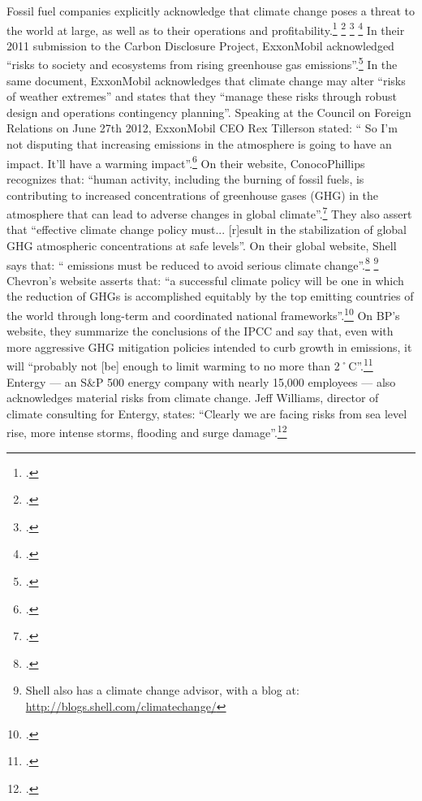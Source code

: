 \documentclass[10pt]{article}
\begin{document}
Fossil fuel companies explicitly acknowledge that climate change poses a threat to the world at large, as well as to their operations and profitability.\footcite[][]{FFcorpsPlanning} \footcite[][]{OilCosFearFI} \footcite[][]{DemiseOfCrudeDenial} \footcite[][]{DoTheOpposite}
In their 2011 submission to the Carbon Disclosure Project, ExxonMobil acknowledged ``risks to society and ecosystems from rising greenhouse gas emissions''.\footcite[][]{ExxonCDP2011}
In the same document, ExxonMobil acknowledges that climate change may alter ``risks of weather extremes'' and states that they ``manage these risks through robust design and operations contingency planning''.
Speaking at the Council on Foreign Relations on June 27th 2012, ExxonMobil CEO Rex Tillerson stated: `` So I'm not disputing that increasing  emissions in the atmosphere is going to have an impact. It'll have a warming impact''.\footcite[][]{Tillerson}
On their website, ConocoPhillips recognizes that: ``human activity, including the burning of fossil fuels, is contributing to increased concentrations of greenhouse gases (GHG) in the atmosphere that can lead to adverse changes in global climate''.\footcite[][]{ConocoPhillipsCC}
They also assert that ``effective climate change policy must... [r]esult in the stabilization of global GHG atmospheric concentrations at safe levels''.
On their global website, Shell says that: `` emissions must be reduced to avoid serious climate change''.\footcite[][]{ShellClimateChange} \footnote{Shell also has a climate change advisor, with a blog at: \url{http://blogs.shell.com/climatechange/}}
Chevron's website asserts that: ``a successful climate policy will be one in which the reduction of GHGs is accomplished equitably by the top emitting countries of the world through long-term and coordinated national frameworks''.\footcite[][]{ChevronClimateChange}
On BP's website, they summarize the conclusions of the IPCC and say that, even with more aggressive GHG mitigation policies intended to curb growth in  emissions, it will ``probably not [be] enough to limit warming to no more than 2˚C''.\footcite[][]{BPClimateChange}
Entergy --- an S\&P 500 energy company with nearly 15,000 employees --- also acknowledges material risks from climate change.
Jeff Williams, director of climate consulting for Entergy, states: ``Clearly we are facing risks from sea level rise, more intense storms, flooding and surge damage''.\footcite[][]{ShiftToClimatePreparedness}
\end{document}
